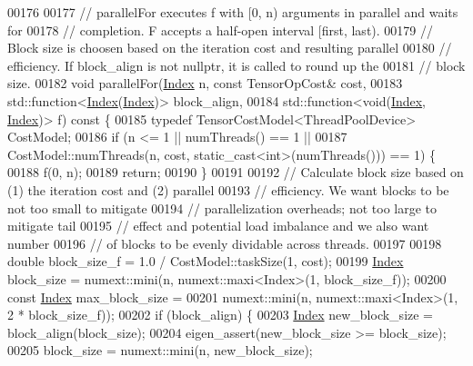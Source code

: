 \begin{DoxyCode}
00176 
00177   \textcolor{comment}{// parallelFor executes f with [0, n) arguments in parallel and waits for}
00178   \textcolor{comment}{// completion. F accepts a half-open interval [first, last).}
00179   \textcolor{comment}{// Block size is choosen based on the iteration cost and resulting parallel}
00180   \textcolor{comment}{// efficiency. If block\_align is not nullptr, it is called to round up the}
00181   \textcolor{comment}{// block size.}
00182   \textcolor{keywordtype}{void} parallelFor(\hyperlink{namespace_eigen_a62e77e0933482dafde8fe197d9a2cfde}{Index} n, \textcolor{keyword}{const} TensorOpCost& cost,
00183                    std::function<\hyperlink{namespace_eigen_a62e77e0933482dafde8fe197d9a2cfde}{Index}(\hyperlink{namespace_eigen_a62e77e0933482dafde8fe197d9a2cfde}{Index})> block\_align,
00184                    std::function<\textcolor{keywordtype}{void}(\hyperlink{namespace_eigen_a62e77e0933482dafde8fe197d9a2cfde}{Index}, \hyperlink{namespace_eigen_a62e77e0933482dafde8fe197d9a2cfde}{Index})> f)\textcolor{keyword}{ const }\{
00185     \textcolor{keyword}{typedef} TensorCostModel<ThreadPoolDevice> CostModel;
00186     \textcolor{keywordflow}{if} (n <= 1 || numThreads() == 1 ||
00187         CostModel::numThreads(n, cost, static\_cast<int>(numThreads())) == 1) \{
00188       f(0, n);
00189       \textcolor{keywordflow}{return};
00190     \}
00191 
00192     \textcolor{comment}{// Calculate block size based on (1) the iteration cost and (2) parallel}
00193     \textcolor{comment}{// efficiency. We want blocks to be not too small to mitigate}
00194     \textcolor{comment}{// parallelization overheads; not too large to mitigate tail}
00195     \textcolor{comment}{// effect and potential load imbalance and we also want number}
00196     \textcolor{comment}{// of blocks to be evenly dividable across threads.}
00197 
00198     \textcolor{keywordtype}{double} block\_size\_f = 1.0 / CostModel::taskSize(1, cost);
00199     \hyperlink{namespace_eigen_a62e77e0933482dafde8fe197d9a2cfde}{Index} block\_size = numext::mini(n, numext::maxi<Index>(1, block\_size\_f));
00200     \textcolor{keyword}{const} \hyperlink{namespace_eigen_a62e77e0933482dafde8fe197d9a2cfde}{Index} max\_block\_size =
00201         numext::mini(n, numext::maxi<Index>(1, 2 * block\_size\_f));
00202     \textcolor{keywordflow}{if} (block\_align) \{
00203       \hyperlink{namespace_eigen_a62e77e0933482dafde8fe197d9a2cfde}{Index} new\_block\_size = block\_align(block\_size);
00204       eigen\_assert(new\_block\_size >= block\_size);
00205       block\_size = numext::mini(n, new\_block\_size);

\end{DoxyCode}
